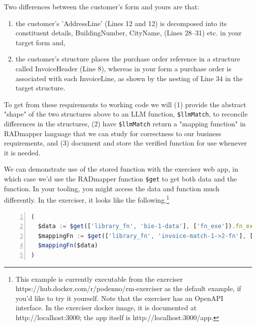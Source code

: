 \documentclass[10pt,letterpaper]{article} %
\newcommand{\stt}[1]{\texttt{#1}} %
\begin{document}
Two differences between the customer's form and yours are that:
\begin{enumerate}
\item{the customer's 'AddressLine' (Lines 12 and 12) is decomposed into its constituent details, BuildingNumber, CityName, (Lines 28--31) etc. in your target form and,}
\item{the customer's structure places the purchase order reference in a structure called InvoiceHeader (Line 8), whereas in your form a purchase order is associated with
each InvoiceLine, as shown by the nesting of Line 34 in the target structure.}
\end{enumerate}

To get from these requirements to working code we will
(1) provide the abstract "shape" of the two structures above to an LLM function, \stt{\$llmMatch}, to reconcile differences in the structures,
(2) have \stt{\$llmMatch} return a "mapping function" in RADmapper language that we can study for correctness to our business requirements, and
(3) document and store the verified function for use whenever it is needed.

We can demonstrate use of the stored function with the exerciser web app, in which case we'd use the RADmapper function \stt{\$get} to get both data and the function.
In your tooling, you might access the data and function much differently.
In the exerciser, it looks like the following.\footnote{This example is currently executable from the exerciser https://hub.docker.com/r/podenno/rm-exerciser as the default example, if you'd like to try it yourself.
  Note that the exerciser has an OpenAPI interface.
  In the exerciser docker image, it is documented at http://localhost:3000; the app itself is http://localhost:3000/app.}

\begin{lstlisting}[language=JavaScript,numberstyle=\scriptsize,basicstyle=\ttfamily\scriptsize,numbers=left,stepnumber=1,breaklines=true]
(
  $data := $get(['library_fn', 'bie-1-data'], ['fn_exe']).fn_exe;
  $mappingFn := $get(['library_fn', 'invoice-match-1->2-fn'], ['fn_exe']).fn_exe;
  $mappingFn($data)
)
\end{lstlisting} \vspace{-2em}
\end{document}

